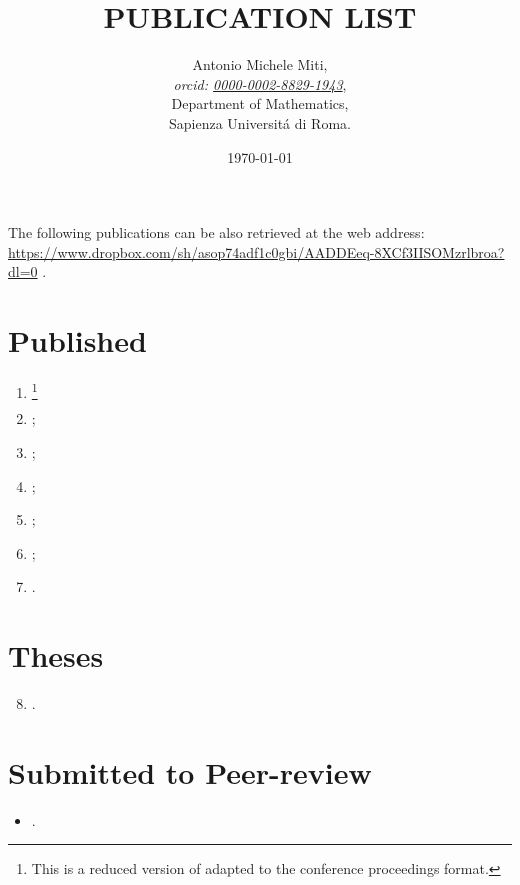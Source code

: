 \documentclass[a4paper]{article}
\title{PUBLICATION LIST}
\date{\today}
\author{
	Antonio Michele Miti,\\
	\emph{orcid: \href{https://orcid.org/0000-0002-8829-1943}{0000-0002-8829-1943}},
	\\
	Department of Mathematics,\\
	Sapienza Universit\'a di Roma.
}
\begin{document}
  

	\maketitle

	\noindent
  The following publications can be also retrieved at the web address:
  \\ 
  \url{https://www.dropbox.com/sh/asop74adf1c0gbi/AADDEeq-8XCf3IISOMzrlbroa?dl=0}
  .
  \nocite{*}


  \section*{Published}
	  \begin{enumerate}
		\item {}\footnote{This is a reduced version of \cite{Luongo2024} adapted to the conference proceedings format.}
    	\item {};
		\item {};	  
		\item {};		
 		\item {};
 		\item {};
 		\item {}.
	  \end{enumerate}

  \section*{Theses}
	  \begin{enumerate}
		\setcounter{enumi}{7}
 	   \item {}.
	  \end{enumerate}


  \section*{Submitted to Peer-review}
	  \begin{itemize}
	   	\item {}.
	  \end{itemize}
\end{document}
